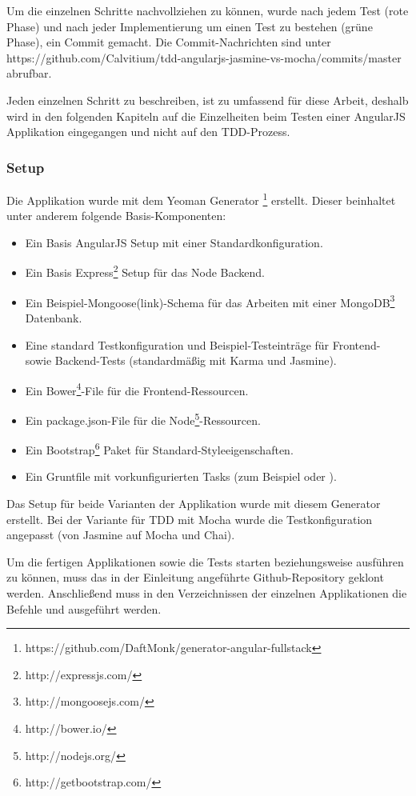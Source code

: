 Um die einzelnen Schritte nachvollziehen zu können, wurde nach jedem Test (rote Phase) und nach jeder Implementierung um einen Test zu bestehen (grüne Phase), ein Commit gemacht. Die Commit-Nachrichten sind unter https://github.com/Calvitium/tdd-angularjs-jasmine-vs-mocha/commits/master abrufbar.

Jeden einzelnen Schritt zu beschreiben, ist zu umfassend für diese Arbeit, deshalb wird in den folgenden Kapiteln auf die Einzelheiten beim Testen einer AngularJS Applikation eingegangen und nicht auf den TDD-Prozess.

\subsubsection{Setup}
Die Applikation wurde mit dem Yeoman Generator \footnote{https://github.com/DaftMonk/generator-angular-fullstack} erstellt. Dieser beinhaltet unter anderem folgende Basis-Komponenten:
\begin{itemize}
 \item Ein Basis AngularJS Setup mit einer Standardkonfiguration.
 \item Ein Basis Express\footnote{http://expressjs.com/} Setup für das Node Backend.
 \item Ein Beispiel-Mongoose(link)-Schema für das Arbeiten mit einer MongoDB\footnote{http://mongoosejs.com/} Datenbank.
 \item Eine standard Testkonfiguration und Beispiel-Testeinträge für Frontend- sowie Backend-Tests (standardmäßig mit Karma und Jasmine).
 \item Ein Bower\footnote{http://bower.io/}-File für die Frontend-Ressourcen.
 \item Ein package.json-File für die Node\footnote{http://nodejs.org/}-Ressourcen.
 \item Ein Bootstrap\footnote{http://getbootstrap.com/} Paket für Standard-Styleeigenschaften.
 \item Ein Gruntfile mit vorkunfigurierten Tasks (zum Beispiel  oder ).
\end{itemize}

Das Setup für beide Varianten der Applikation wurde mit diesem Generator erstellt. Bei der Variante für TDD mit Mocha wurde die Testkonfiguration angepasst (von Jasmine auf Mocha und Chai).

Um die fertigen Applikationen sowie die Tests starten beziehungsweise ausführen zu können, muss das in der Einleitung angeführte Github-Repository geklont werden. Anschließend muss in den Verzeichnissen der einzelnen Applikationen die Befehle  und  ausgeführt werden.

